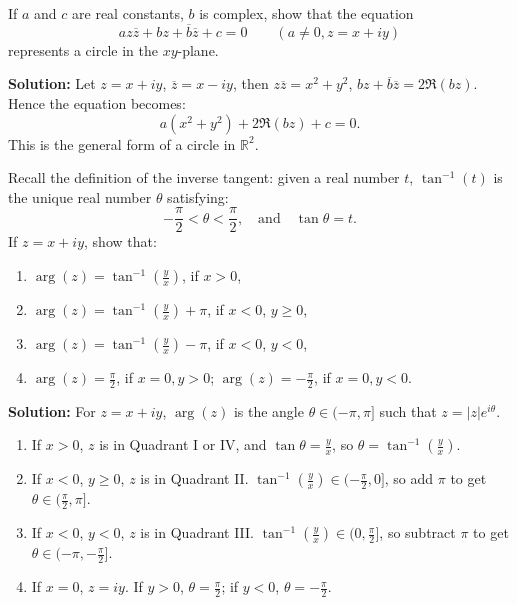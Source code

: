 \begin{problembox}
If \( a \) and \( c \) are real constants, \( b \) is complex, show that the equation
\[
az\overline{z} + bz + \overline{b} \overline{z} + c = 0 \qquad (a \ne 0, z = x + iy)
\]
represents a circle in the \( xy \)-plane.
\end{problembox}

\textbf{Solution:}
Let \( z = x + iy \), \( \overline{z} = x - iy \), then \( z \overline{z} = x^2 + y^2 \), \( bz + \overline{b} \overline{z} = 2 \Re(b z) \). Hence the equation becomes:
\[
a(x^2 + y^2) + 2 \Re(b z) + c = 0.
\]
This is the general form of a circle in \( \mathbb{R}^2 \).

\begin{problembox}
Recall the definition of the inverse tangent: given a real number \( t \), \( \tan^{-1}(t) \) is the unique real number \( \theta \) satisfying:
\[
-\frac{\pi}{2} < \theta < \frac{\pi}{2}, \quad \text{and} \quad \tan \theta = t.
\]
If \( z = x + iy \), show that:
\begin{enumerate}[label=\alph*)]
\item \( \arg(z) = \tan^{-1}\left( \frac{y}{x} \right) \), if \( x > 0 \),
\item \( \arg(z) = \tan^{-1}\left( \frac{y}{x} \right) + \pi \), if \( x < 0 \), \( y \geq 0 \),
\item \( \arg(z) = \tan^{-1}\left( \frac{y}{x} \right) - \pi \), if \( x < 0 \), \( y < 0 \),
\item \( \arg(z) = \frac{\pi}{2} \), if \( x = 0, y > 0 \); \quad \( \arg(z) = -\frac{\pi}{2} \), if \( x = 0, y < 0 \).
\end{enumerate}
\end{problembox}

\textbf{Solution:}
For \( z = x + iy \), \( \arg(z) \) is the angle \( \theta \in (-\pi, \pi] \) such that \( z = |z| e^{i\theta} \).
\begin{enumerate}[label=\alph*)]
\item If \( x > 0 \), \( z \) is in Quadrant I or IV, and \( \tan \theta = \frac{y}{x} \), so \( \theta = \tan^{-1}\left( \frac{y}{x} \right) \).
\item If \( x < 0 \), \( y \geq 0 \), \( z \) is in Quadrant II. \( \tan^{-1}\left( \frac{y}{x} \right) \in (-\frac{\pi}{2}, 0] \), so add \( \pi \) to get \( \theta \in (\frac{\pi}{2}, \pi] \).
\item If \( x < 0 \), \( y < 0 \), \( z \) is in Quadrant III. \( \tan^{-1}\left( \frac{y}{x} \right) \in (0, \frac{\pi}{2}] \), so subtract \( \pi \) to get \( \theta \in (-\pi, -\frac{\pi}{2}] \).
\item If \( x = 0 \), \( z = iy \). If \( y > 0 \), \( \theta = \frac{\pi}{2} \); if \( y < 0 \), \( \theta = -\frac{\pi}{2} \).
\end{enumerate}

